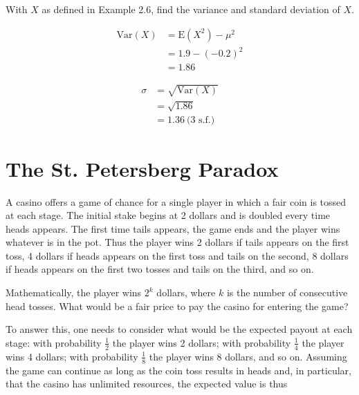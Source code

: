 \documentclass[11pt,a4paper]{book}
\begin{document}
\begin{example}

With $X$ as defined in \textsf{Example 2.6}, find the variance and standard
deviation of $X$.

\Solution

\begin{align*}
\text{Var}\left(X\right) & =\text{E}\left(X^{2}\right)-\mu^{2}\\
 & =1.9-\left(-0.2\right)^{2}\\
 & =1.86
\end{align*}

\begin{align*}
\sigma & =\sqrt{\text{Var}\left(X\right)}\\
 & =\sqrt{1.86}\\
 & =1.36\:\text{(3 s.f.)}
\end{align*}

\end{example}

\newpage

\section{The St. Petersberg Paradox}

A casino offers a game of chance for a single player in which a fair
coin is tossed at each stage. The initial stake begins at 2 dollars
and is doubled every time heads appears. The first time tails appears,
the game ends and the player wins whatever is in the pot. Thus the
player wins 2 dollars if tails appears on the first toss, 4 dollars
if heads appears on the first toss and tails on the second, 8 dollars
if heads appears on the first two tosses and tails on the third, and
so on.

Mathematically, the player wins $2^{k}$ dollars, where $k$ is the
number of consecutive head tosses. What would be a fair price to pay
the casino for entering the game?

To answer this, one needs to consider what would be the expected payout
at each stage: with probability ${\displaystyle \frac{1}{2}}$ the
player wins 2 dollars; with probability ${\displaystyle \frac{1}{4}}$
the player wins 4 dollars; with probability ${\displaystyle \frac{1}{8}}$
the player wins 8 dollars, and so on. Assuming the game can continue
as long as the coin toss results in heads and, in particular, that
the casino has unlimited resources, the expected value is thus
\end{document}
